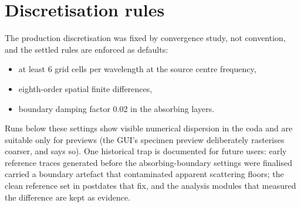 \section{Discretisation rules}

The production discretisation was fixed by convergence study, not
convention, and the settled rules are enforced as defaults:

\begin{itemize}
  \item at least 6 grid cells per wavelength at the source centre
    frequency,
  \item eighth-order spatial finite differences,
  \item boundary damping factor 0.02 in the absorbing layers.
\end{itemize}

Runs below these settings show visible numerical dispersion in the
coda and are suitable only for previews (the GUI's specimen preview
deliberately rasterises coarser, and says so). One historical trap is
documented for future users: early reference traces generated before
the absorbing-boundary settings were finalised carried a boundary
artefact that contaminated apparent scattering floors; the clean
reference set in  postdates that fix, and the analysis
modules that measured the difference are kept as evidence.
